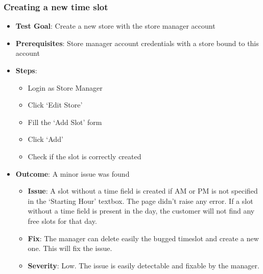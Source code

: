 \subsubsection{Creating a new time slot}
\begin{itemize}
    \item \textbf{Test Goal}: Create a new store with the store manager account
    \item \textbf{Prerequisites}: Store manager account credentials with a store bound to this account
    \item \textbf{Steps}:
          \begin{itemize}
              \item Login as Store Manager
              \item Click `Edit Store'
              \item Fill the `Add Slot' form
              \item Click `Add'
              \item Check if the slot is correctly created
          \end{itemize}
    \item \textbf{Outcome}:  A minor issue was found
          \begin{itemize}
              \item \textbf{Issue}: A slot without a time field is created if AM or PM is not specified in the `Starting Hour' textbox. The page didn't raise any error.
                    If a slot without a time field is present in the day, the customer will not find any free slots for that day.
              \item \textbf{Fix}: The manager can delete easily the bugged timeslot and create a new one. This will fix the issue.
              \item \textbf{Severity}: Low. The issue is easily detectable and fixable by the manager.
          \end{itemize}
\end{itemize}
